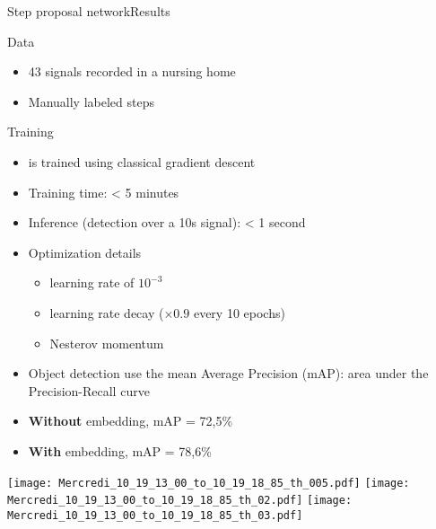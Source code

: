 \begin{frame}{Step proposal network}{Results}
\begin{minipage}[t]{0.4\linewidth}
    \vspace{0pt}
    Data
    \begin{itemize}
        \item 43 signals recorded in a nursing home
        \item Manually labeled steps
    \end{itemize}
    Training
    \begin{itemize}
        \item \subalgo is trained using classical gradient descent
        \item Training time: < 5 minutes
        \item Inference (detection over a 10s signal): < 1 second
        \item Optimization details
        \begin{itemize}
            \item learning rate of $10^{-3}$
            \item learning rate decay ($\times 0.9$ every 10 epochs)
            \item Nesterov momentum
        \end{itemize}
    \end{itemize}
\end{minipage}\hfill
\begin{minipage}[t]{0.54\linewidth}
    \vspace{0pt}
    \begin{itemize}
        \item Object detection use the mean Average Precision (mAP): area under the Precision-Recall curve
        \item \textbf{Without} embedding, mAP = 72,5\%
        \item \textbf{With} embedding, mAP = 78,6\%
    \end{itemize}
\pause
\renewcommand{\ratio}{1.00}
    \begin{overprint}
        \centering\texttt{[image: Mercredi\_10\_19\_13\_00\_to\_10\_19\_18\_85\_th\_005.pdf]}
        \centering\texttt{[image: Mercredi\_10\_19\_13\_00\_to\_10\_19\_18\_85\_th\_02.pdf]}
        \centering\texttt{[image: Mercredi\_10\_19\_13\_00\_to\_10\_19\_18\_85\_th\_03.pdf]}
    \end{overprint}
\end{minipage}
\end{frame}

